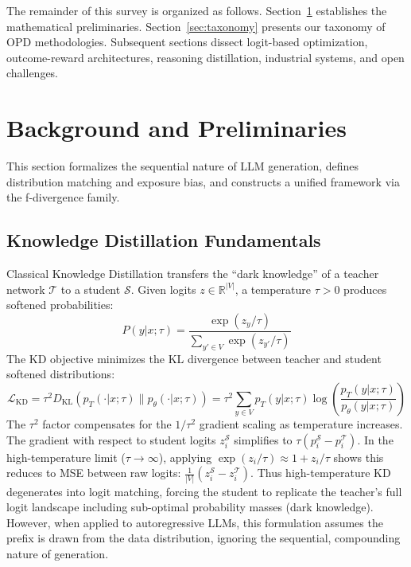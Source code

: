 \documentclass{article} %
\newcommand{\KL}{D_{\mathrm{KL}}}
\newcommand{\ptheta}{p_\theta}
\newcommand{\pteacher}{p_T}
\newcommand{\loss}{\mathcal{L}}
\begin{document}
The remainder of this survey is organized as follows. Section~\ref{sec:background} establishes the mathematical preliminaries. Section~\ref{sec:taxonomy} presents our taxonomy of OPD methodologies. Subsequent sections dissect logit-based optimization, outcome-reward architectures, reasoning distillation, industrial systems, and open challenges.


\section{Background and Preliminaries}
\label{sec:background}

This section formalizes the sequential nature of LLM generation, defines distribution matching and exposure bias, and constructs a unified framework via the f-divergence family.

\subsection{Knowledge Distillation Fundamentals}
\label{subsec:kd_fundamentals}

Classical Knowledge Distillation \citep{hinton2015distilling} transfers the ``dark knowledge'' of a teacher network $\mathcal{T}$ to a student $\mathcal{S}$. Given logits $z \in \mathbb{R}^{|V|}$, a temperature $\tau > 0$ produces softened probabilities:
\begin{equation}
    P(y|x; \tau) = \frac{\exp(z_y / \tau)}{\sum_{y' \in V} \exp(z_{y'} / \tau)}
\end{equation}
The KD objective minimizes the KL divergence between teacher and student softened distributions:
\begin{equation}
    \loss_{\mathrm{KD}} = \tau^2 \KL(\pteacher(\cdot|x; \tau) \parallel \ptheta(\cdot|x; \tau)) = \tau^2 \sum_{y \in V} \pteacher(y|x; \tau) \log \left( \frac{\pteacher(y|x; \tau)}{\ptheta(y|x; \tau)} \right)
\end{equation}
The $\tau^2$ factor compensates for the $1/\tau^2$ gradient scaling as temperature increases. The gradient with respect to student logits $z_i^{\mathcal{S}}$ simplifies to $\tau (p_i^{\mathcal{S}} - p_i^{\mathcal{T}})$. In the high-temperature limit ($\tau \to \infty$), applying $\exp(z_i/\tau) \approx 1 + z_i/\tau$ shows this reduces to MSE between raw logits: $\frac{1}{|V|} (z_i^{\mathcal{S}} - z_i^{\mathcal{T}})$. Thus high-temperature KD degenerates into logit matching, forcing the student to replicate the teacher's full logit landscape including sub-optimal probability masses (dark knowledge). However, when applied to autoregressive LLMs, this formulation assumes the prefix is drawn from the data distribution, ignoring the sequential, compounding nature of generation.
\end{document}
